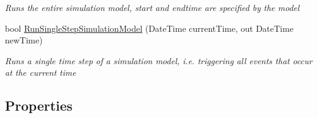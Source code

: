 \begin{DoxyCompactItemize}
\begin{DoxyCompactList}\small\item\em Runs the entire simulation model, start and endtime are specified by the model \end{DoxyCompactList}\item 
bool \hyperlink{class_simulation_core_1_1_simulation_classes_1_1_simulation_engine_aab00637dc32e212246b5c5d66fd53055}{Run\+Single\+Step\+Simulation\+Model} (Date\+Time current\+Time, out Date\+Time new\+Time)
\begin{DoxyCompactList}\small\item\em Runs a single time step of a simulation model, i.\+e. triggering all events that occur at the current time \end{DoxyCompactList}\end{DoxyCompactItemize}
\subsection*{Properties}
